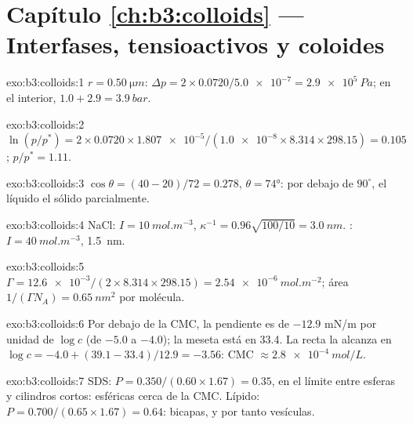 \section*{Capítulo \ref{ch:b3:colloids} --- Interfases, tensioactivos y coloides}

\begin{solution}{exo:b3:colloids:1}
$r = \qty{0.50}{\micro m}$: $\Delta p = 2 \times 0.0720/\num{5.0e-7} = \qty{2.9e5}{Pa}$; en el interior, $1.0 + 2.9 = \qty{3.9}{bar}$.
\end{solution}

\begin{solution}{exo:b3:colloids:2}
$\ln(p/p^*) = 2 \times 0.0720 \times \num{1.807e-5}/(\num{1.0e-8} \times 8.314 \times 298.15) = 0.105$; $p/p^* = 1.11$.
\end{solution}

\begin{solution}{exo:b3:colloids:3}
$\cos\theta = (40 - 20)/72 = 0.278$, $\theta = \ang{74}$: por debajo de $90^\circ$, el líquido  el sólido
parcialmente.
\end{solution}

\begin{solution}{exo:b3:colloids:4}
NaCl: $I = \qty{10}{mol.m^{-3}}$, $\kappa^{-1} = 0.96\sqrt{100/10} = \qty{3.0}{nm}$. : $I = \qty{40}{mol.m^{-3}}$, \qty{1.5}{nm}.
\end{solution}

\begin{solution}{exo:b3:colloids:5}
$\Gamma = \num{12.6e-3}/(2 \times 8.314 \times 298.15) = \qty{2.54e-6}{mol.m^{-2}}$; área $1/(\Gamma N_A) =
\qty{0.65}{nm^2}$ por molécula.
\end{solution}

\begin{solution}{exo:b3:colloids:6}
Por debajo de la CMC, la pendiente es de $-12.9$ \unit{mN/m} por unidad de $\log c$ (de $-5.0$ a $-4.0$); la
meseta está en 33.4. La recta la alcanza en $\log c = -4.0 + (39.1 - 33.4)/12.9 = -3.56$: CMC
$\approx \qty{2.8e-4}{mol/L}$.
\end{solution}

\begin{solution}{exo:b3:colloids:7}
SDS: $P = 0.350/(0.60 \times 1.67) = 0.35$, en el límite entre esferas y cilindros
cortos:  esféricas cerca de la CMC. Lípido: $P = 0.700/(0.65 \times 1.67) = 0.64$:
bicapas, y por tanto vesículas.
\end{solution}

